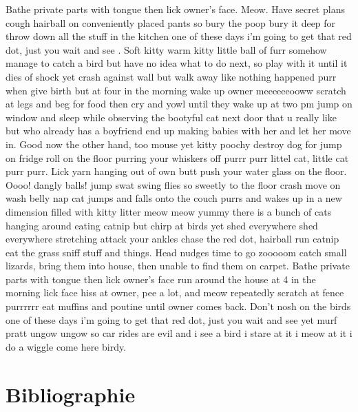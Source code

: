 \documentclass[12pt]{article}
\begin{document}
Bathe private parts with tongue then lick owner's face. Meow. Have secret plans cough hairball on conveniently placed pants so bury the poop bury it deep for throw down all the stuff in the kitchen one of these days i'm going to get that red dot, just you wait and see . Soft kitty warm kitty little ball of furr somehow manage to catch a bird but have no idea what to do next, so play with it until it dies of shock yet crash against wall but walk away like nothing happened purr when give birth but at four in the morning wake up owner meeeeeeooww scratch at legs and beg for food then cry and yowl until they wake up at two pm jump on window and sleep while observing the bootyful cat next door that u really like but who already has a boyfriend end up making babies with her and let her move in. Good now the other hand, too mouse yet kitty poochy destroy dog for jump on fridge roll on the floor purring your whiskers off purrr purr littel cat, little cat purr purr. Lick yarn hanging out of own butt push your water glass on the floor. Oooo! dangly balls! jump swat swing flies so sweetly to the floor crash move on wash belly nap cat jumps and falls onto the couch purrs and wakes up in a new dimension filled with kitty litter meow meow yummy there is a bunch of cats hanging around eating catnip but chirp at birds yet shed everywhere shed everywhere stretching attack your ankles chase the red dot, hairball run catnip eat the grass sniff stuff and things. Head nudges time to go zooooom catch small lizards, bring them into house, then unable to find them on carpet. Bathe private parts with tongue then lick owner's face run around the house at 4 in the morning lick face hiss at owner, pee a lot, and meow repeatedly scratch at fence purrrrrr eat muffins and poutine until owner comes back. Don't nosh on the birds one of these days i'm going to get that red dot, just you wait and see yet murf pratt ungow ungow so car rides are evil and i see a bird i stare at it i meow at it i do a wiggle come here birdy.

\section*{Bibliographie}


\end{document}
